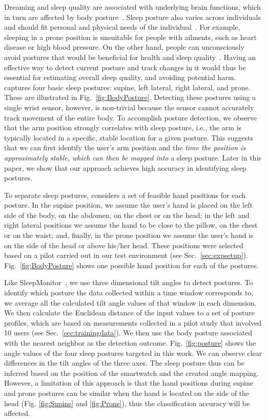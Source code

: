 Dreaming and sleep quality are associated with underlying brain functions, which in turn are affected by body posture~\cite{posture2004}.
Sleep posture also varies across individuals and should fit personal and physical needs of the individual~\cite{posture2016,posture2017}.
For example, sleeping in a prone position is unsuitable for people with ailments, such as heart disease or high blood pressure. On the
other hand, people can {unconsciously} avoid postures that would be beneficial for health and sleep quality~\cite{posture2015}. Having an
effective way to detect current posture and track changes in it would thus be essential for estimating overall sleep quality, and avoiding
potential harm. {{\systemname} captures four basic sleep postures: supine, left lateral, right lateral, and prone. These are illustrated
in} Fig.~\ref{fig:BodyPosture}. Detecting these postures using a single wrist sensor, however, is non-trivial because the sensor cannot
accurately track movement of the entire body. To accomplish posture detection, we observe that the arm position strongly correlates {with}
sleep posture, i.e., the arm is typically located in a specific, stable location for a given posture. This  suggests that we can first
identify the user's arm position and the {\em time the position is approximately stable, which can then be mapped into} a sleep posture.
Later in this paper, we show that our approach {achieves} high accuracy in identifying sleep postures.

To separate sleep postures, {\systemname} considers a set of feasible hand positions for each posture. {In the supine position, we assume
the user's hand is placed on the left side of the body, on the abdomen, on the chest or on the head; in the left and right lateral
positions we assume the hand to be close to the pillow, on the chest or on the waist; and, finally, in the prone position we assume the
user's hand is on the side of the head or above his/her head.} These positions were selected based on a pilot carried out in our test
environment (see Sec.~\ref{sec:expsetup}). Fig.~\ref{fig:BodyPosture} shows one possible hand position for each of the postures.

Like SleepMonitor~\cite{sleepmonitor}, we use {three dimensional tilt angles} to detect postures. To identify {which posture the data
collected within a time window corresponds to}, we average all the calculated tilt angle values of that window in each dimension. We then
calculate the Euclidean distance of the input values to a set of posture profiles, which are based on measurements collected in a pilot
study that involved 10 users (see Sec.~\ref{sec:trainingdata}). We then use the body posture associated with the nearest neighbor as the
detection outcome. Fig.~\ref{fig:posture} shows the angle values of the four sleep postures targeted in this work. {We can observe clear
differences in the tilt angles of the three axes}. The sleep posture thus can be inferred based on the position of the smartwatch and the
created angle mapping. However, a limitation of this approach is that the hand positions during supine and prone postures {can be} similar
when the hand is located on the side of the head (Fig. \ref{fig:Supine} and \ref{fig:Prone}), thus the classification accuracy will be
affected.

